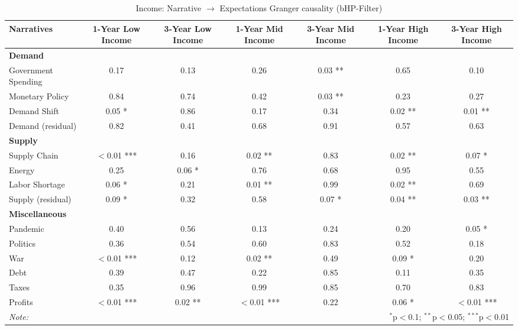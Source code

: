 \begin{sidewaystable}[H]
\centering
\footnotesize
\caption{Income: Narrative $\rightarrow$ Expectations Granger causality (bHP-Filter)}\label{table:granger}

\begin{tabular}{lcccccc}
 \toprule
\textbf{Narratives} & \textbf{1-Year Low Income} & \textbf{3-Year Low Income} & \textbf{1-Year Mid Income} & \textbf{3-Year Mid Income} & \textbf{1-Year High Income} & \textbf{3-Year High Income} \\
\midrule
\multicolumn{7}{l}{\textbf{Demand}} \\
\midrule
Government Spending & 0.17 & 0.13 & 0.26 & 0.03 ** & 0.65 & 0.10 \\
Monetary Policy & 0.84 & 0.74 & 0.42 & 0.03 ** & 0.23 & 0.27 \\
Demand Shift & 0.05 * & 0.86 & 0.17 & 0.34 & 0.02 ** & 0.01 ** \\
Demand (residual) & 0.82 & 0.41 & 0.68 & 0.91 & 0.57 & 0.63 \\
\midrule
\multicolumn{7}{l}{\textbf{Supply}} \\
\midrule
Supply Chain & $<$0.01 *** & 0.16 & 0.02 ** & 0.83 & 0.02 ** & 0.07 * \\
Energy & 0.25 & 0.06 * & 0.76 & 0.68 & 0.95 & 0.55 \\
Labor Shortage & 0.06 * & 0.21 & 0.01 ** & 0.99 & 0.02 ** & 0.69 \\
Supply (residual) & 0.09 * & 0.32 & 0.58 & 0.07 * & 0.04 ** & 0.03 ** \\
\midrule
\multicolumn{7}{l}{\textbf{Miscellaneous}} \\
\midrule
Pandemic & 0.40 & 0.56 & 0.13 & 0.24 & 0.20 & 0.05 * \\
Politics & 0.36 & 0.54 & 0.60 & 0.83 & 0.52 & 0.18 \\
War & $<$0.01 *** & 0.12 & 0.02 ** & 0.49 & 0.09 * & 0.20 \\
Debt & 0.39 & 0.47 & 0.22 & 0.85 & 0.11 & 0.35 \\
Taxes & 0.35 & 0.96 & 0.99 & 0.85 & 0.70 & 0.83 \\
Profits & $<$0.01 *** & 0.02 ** & $<$0.01 *** & 0.22 & 0.06 * & $<$0.01 *** \\
\midrule
\bottomrule
\textit{Note:}  & \multicolumn{6}{r}{$^{*}$p$<$0.1; $^{**}$p$<$0.05; $^{***}$p$<$0.01} \\
\bottomrule
\end{tabular}
\end{sidewaystable}
